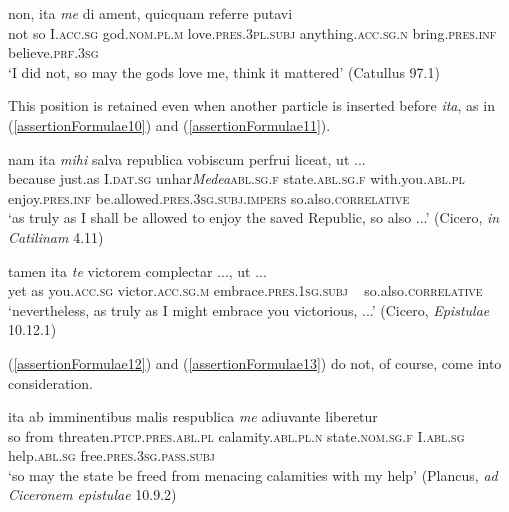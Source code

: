 \begin{exe}
\ex
\gll non, ita \emph{me} di ament, quicquam referre putavi\\
not so I.\textsc{acc.sg} god.\textsc{nom.pl.m} love.\textsc{pres.3pl.subj} anything.\textsc{acc.sg.n} bring.\textsc{pres.inf} believe.\textsc{prf.3sg}\\
\trans `I did not, so may the gods love me, think it mattered’ (Catullus 97.1)
\label{assertionFormulae9}
\end{exe}

This position is retained even when another particle is inserted before \emph{ita}, as in (\ref{assertionFormulae10}) and (\ref{assertionFormulae11}).

\begin{exe}
\ex
\gll nam ita \emph{mihi} salva republica vobiscum perfrui liceat, ut ...\\
because just.as I.\textsc{dat.sg} unhar\textit{Medea}\textsc{abl.sg.f} state.\textsc{abl.sg.f} with.you.\textsc{abl.pl} enjoy.\textsc{pres.inf} be.allowed.\textsc{pres.3sg.subj.impers} so.also.\textsc{correlative} ~\\
\trans `as truly as I shall be allowed to enjoy the saved Republic, so also ...' (Cicero, \textit{in Catilinam} 4.11)
\label{assertionFormulae10}
\end{exe}

\begin{exe}
\ex
\gll tamen ita \emph{te} victorem complectar ..., ut ...\\
yet as you.\textsc{acc.sg} victor.\textsc{acc.sg.m} embrace.\textsc{pres.1sg.subj} ~ so.also.\textsc{correlative} ~\\
\trans `nevertheless, as truly as I might embrace you victorious, ...' (Cicero, \textit{Epistulae} 10.12.1)
\label{assertionFormulae11}
\end{exe}

(\ref{assertionFormulae12}) and (\ref{assertionFormulae13}) do not, of course, come into consideration.

\begin{exe}
\ex
\gll ita ab imminentibus malis respublica \emph{me} adiuvante liberetur\\
so from threaten.\textsc{ptcp.pres.abl.pl} calamity.\textsc{abl.pl.n} state.\textsc{nom.sg.f} I.\textsc{abl.sg} help.\textsc{abl.sg} free.\textsc{pres.3sg.pass.subj}\\
\trans `so may the state be freed from menacing calamities with my help' (Plancus, \textit{ad Ciceronem epistulae} 10.9.2)
\label{assertionFormulae12}
\end{exe}

